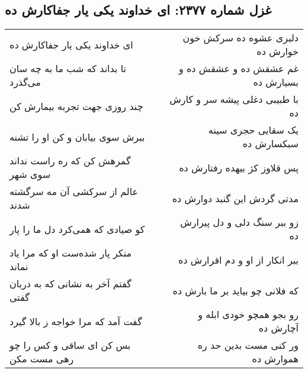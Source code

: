 \begin{center}
\section*{غزل شماره ۲۳۷۷: ای خداوند یکی یار جفاکارش ده}
\label{sec:2377}
\begin{longtable}{l p{0.5cm} r}
ای خداوند یکی یار جفاکارش ده
&&
دلبری عشوه ده سرکش خون خوارش ده
\\
تا بداند که شب ما به چه سان می‌گذرد
&&
غم عشقش ده و عشقش ده و بسیارش ده
\\
چند روزی جهت تجربه بیمارش کن
&&
با طبیبی دغلی پیشه سر و کارش ده
\\
ببرش سوی بیابان و کن او را تشنه
&&
یک سقایی حجری سینه سبکسارش ده
\\
گمرهش کن که ره راست نداند سوی شهر
&&
پس قلاوز کژ بیهده رفتارش ده
\\
عالم از سرکشی آن مه سرگشته شدند
&&
مدتی گردش این گنبد دوارش ده
\\
کو صیادی که همی‌کرد دل ما را پار
&&
زو ببر سنگ دلی و دل پیرارش ده
\\
منکر پار شده‌ست او که مرا یاد نماند
&&
ببر انکار از او و دم اقرارش ده
\\
گفتم آخر به نشانی که به دربان گفتی
&&
که فلانی چو بیاید بر ما بارش ده
\\
گفت آمد که مرا خواجه ز بالا گیرد
&&
رو بجو همچو خودی ابله و آچارش ده
\\
بس کن ای ساقی و کس را چو رهی مست مکن
&&
ور کنی مست بدین حد ره هموارش ده
\\
\end{longtable}
\end{center}

